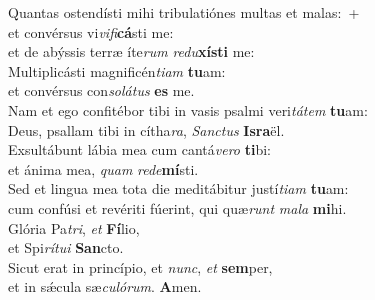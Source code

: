 \evenverse Quantas ostendísti mihi tribulatiónes multas et malas:~+\\
\evenverse  et convérsus vi\textit{vi}\textit{fi}\textbf{cá}sti me:~\*\\
\evenverse et de abýssis terræ íte\textit{rum} \textit{re}\textit{du}\textbf{xí}\textbf{sti} me:\\
\oddverse Multiplicásti magnificén\textit{ti}\textit{am} \textbf{tu}am:~\*\\
\oddverse et convérsus con\textit{so}\textit{lá}\textit{tus} \textbf{es} me.\\
\evenverse Nam et ego confitébor tibi in vasis psalmi veri\textit{tá}\textit{tem} \textbf{tu}am:~\*\\
\evenverse Deus, psallam tibi in cítha\textit{ra}, \textit{San}\textit{ctus} \textbf{Is}\textbf{ra}ël.\\
\oddverse Exsultábunt lábia mea cum cantá\textit{ve}\textit{ro} \textbf{ti}bi:~\*\\
\oddverse et ánima mea, \textit{quam} \textit{re}\textit{de}\textbf{mí}sti.\\
\evenverse Sed et lingua mea tota die meditábitur justí\textit{ti}\textit{am} \textbf{tu}am:~\*\\
\evenverse cum confúsi et revériti fúerint, qui quæ\textit{runt} \textit{ma}\textit{la} \textbf{mi}hi.\\
\oddverse Glória Pa\textit{tri}, \textit{et} \textbf{Fí}lio,~\*\\
\oddverse et Spi\textit{rí}\textit{tu}\textit{i} \textbf{San}cto.\\
\evenverse Sicut erat in princípio, et \textit{nunc}, \textit{et} \textbf{sem}per,~\*\\
\evenverse et in sǽcula sæ\textit{cu}\textit{ló}\textit{rum}. \textbf{A}men.\\
